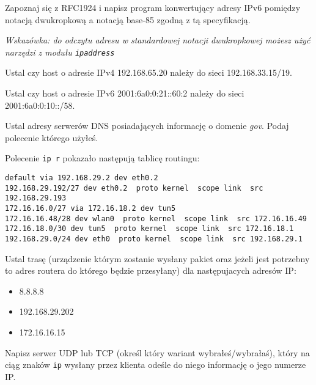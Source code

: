 \dbEntryCheckResults
Zapoznaj się z RFC1924 i napisz program konwertujący adresy IPv6 pomiędzy notacją dwukropkową a notacją base-85 zgodną z tą specyfikacją.

\textit{Wskazówka: do odczytu adresu w standardowej notacji dwukropkowej możesz użyć narzędzi z modułu \texttt{ipaddress}}
\fi


\dbEntryCheckResults
Ustal czy host o adresie IPv4 192.168.65.20 należy do sieci 192.168.33.15/19.
\fi

\dbEntryCheckResults
Ustal czy host o adresie IPv6 2001:6a0:0:21::60:2 należy do sieci 2001:6a0:0:10::/58.
\fi


\dbEntryCheckResults
Ustal adresy serwerów DNS posiadających informację o domenie \emph{gov}. Podaj polecenie którego użyłeś.
\fi

\dbEntryCheckResults
Polecenie \Verb#ip r# pokazało następują tablicę routingu:

\begin{Verbatim}
default via 192.168.29.2 dev eth0.2 
192.168.29.192/27 dev eth0.2  proto kernel  scope link  src 192.168.29.193
172.16.16.0/27 via 172.16.18.2 dev tun5 
172.16.16.48/28 dev wlan0  proto kernel  scope link  src 172.16.16.49 
172.16.18.0/30 dev tun5  proto kernel  scope link  src 172.16.18.1 
192.168.29.0/24 dev eth0  proto kernel  scope link  src 192.168.29.1 
\end{Verbatim}
Ustal trasę (urządzenie którym zostanie wysłany pakiet oraz jeżeli jest potrzebny to adres routera do którego będzie przesyłany) dla następujacych adresów IP:
\begin{itemize}
	\item 8.8.8.8
	\item 192.168.29.202
	\item 172.16.16.15
\end{itemize}
\fi

\dbEntryCheckResults
Napisz serwer UDP lub TCP (określ który wariant wybrałeś/wybrałaś), który na ciąg znaków \texttt{ip} wysłany przez klienta odeśle do niego informację o jego numerze IP.
\fi





